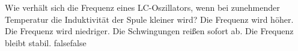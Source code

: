     {Wie verhält sich die Frequenz eines LC-Oszillators, wenn bei zunehmender Temperatur die Induktivität der Spule kleiner wird?}
    {Die Frequenz wird höher.}
    {Die Frequenz wird niedriger.}
    {Die Schwingungen reißen sofort ab.}
    {Die Frequenz bleibt stabil.}
    {false}{false}